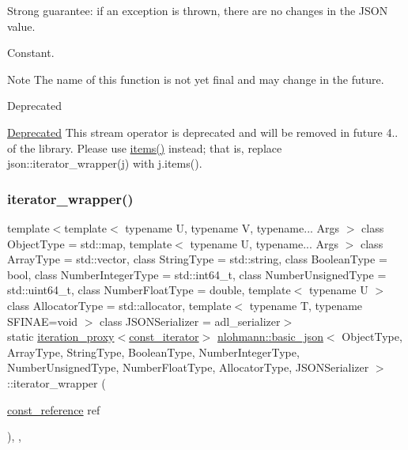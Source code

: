 Strong guarantee\+: if an exception is thrown, there are no changes in the J\+S\+ON value.

Constant.

\begin{DoxyNote}{Note}
The name of this function is not yet final and may change in the future.
\end{DoxyNote}
\begin{DoxyRefDesc}{Deprecated}
\item[\mbox{\hyperlink{deprecated__deprecated000001}{Deprecated}}]This stream operator is deprecated and will be removed in future 4.. of the library. Please use \mbox{\hyperlink{classnlohmann_1_1basic__json_afe3e137ace692efa08590d8df40f58dd}{items()}} instead; that is, replace {\ttfamily json\+::iterator\+\_\+wrapper(j)} with {\ttfamily j.\+items()}. \end{DoxyRefDesc}
\mbox{\label{classnlohmann_1_1basic__json_a4d8795ce15be7ce2a95260663bde640d}} 
\subsubsection{\texorpdfstring{iterator\+\_\+wrapper()}{iterator\_wrapper()}\hspace{0.1cm}{\footnotesize\ttfamily [2/2]}}
{\footnotesize\ttfamily template$<$template$<$ typename U, typename V, typename... Args $>$ class Object\+Type = std\+::map, template$<$ typename U, typename... Args $>$ class Array\+Type = std\+::vector, class String\+Type  = std\+::string, class Boolean\+Type  = bool, class Number\+Integer\+Type  = std\+::int64\+\_\+t, class Number\+Unsigned\+Type  = std\+::uint64\+\_\+t, class Number\+Float\+Type  = double, template$<$ typename U $>$ class Allocator\+Type = std\+::allocator, template$<$ typename T, typename S\+F\+I\+N\+A\+E=void $>$ class J\+S\+O\+N\+Serializer = adl\+\_\+serializer$>$ \\
static \mbox{\hyperlink{classnlohmann_1_1detail_1_1iteration__proxy}{iteration\+\_\+proxy}}$<$\mbox{\hyperlink{classnlohmann_1_1basic__json_a41a70cf9993951836d129bb1c2b3126a}{const\+\_\+iterator}}$>$ \mbox{\hyperlink{classnlohmann_1_1basic__json}{nlohmann\+::basic\+\_\+json}}$<$ Object\+Type, Array\+Type, String\+Type, Boolean\+Type, Number\+Integer\+Type, Number\+Unsigned\+Type, Number\+Float\+Type, Allocator\+Type, J\+S\+O\+N\+Serializer $>$\+::iterator\+\_\+wrapper (\begin{DoxyParamCaption}\item[{\mbox{\hyperlink{classnlohmann_1_1basic__json_a4057c5425f4faacfe39a8046871786ca}{const\+\_\+reference}}}]{ref }\end{DoxyParamCaption})\hspace{0.3cm}{\ttfamily [inline]}, {\ttfamily [static]}, {\ttfamily [noexcept]}}




